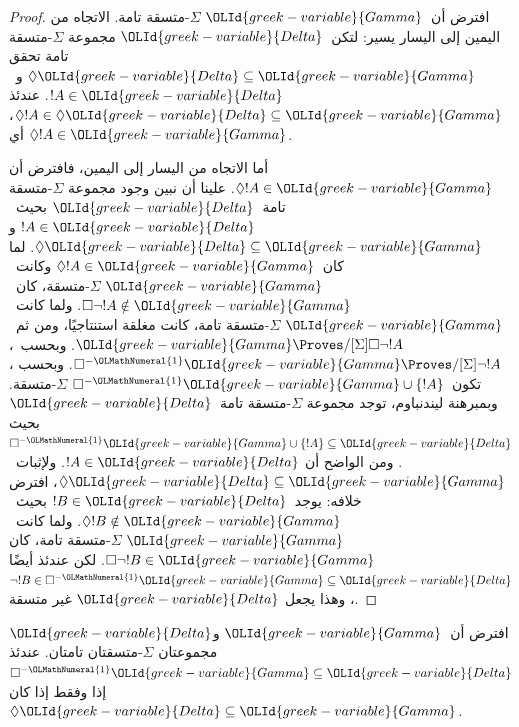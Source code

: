 \documentclass[../../../include/open-logic-section]{subfiles}
\begin{document}
{\begin{proof}
  افترض أن~$\OLId{greek-variable}{Gamma}$ $\Sigma$-متسقة تامة. الاتجاه من اليمين إلى اليسار
  يسير: لتكن~$\OLId{greek-variable}{Delta}$ مجموعة $\Sigma$-متسقة تامة تحقق
  $\Diamond\OLId{greek-variable}{Delta} \subseteq \OLId{greek-variable}{Gamma}$ و~$!A \in \OLId{greek-variable}{Delta}$. عندئذ
  $\Diamond!A \in \Diamond\OLId{greek-variable}{Delta} \subseteq \OLId{greek-variable}{Gamma}$، أي
  $\Diamond!A \in \OLId{greek-variable}{Gamma}$.

  أما الاتجاه من اليسار إلى اليمين، فافترض أن
  $\Diamond !A \in \OLId{greek-variable}{Gamma}$. علينا أن نبين وجود مجموعة $\Sigma$-متسقة
  تامة~$\OLId{greek-variable}{Delta}$ بحيث~$!A \in \OLId{greek-variable}{Delta}$ و
  $\Diamond\OLId{greek-variable}{Delta} \subseteq \OLId{greek-variable}{Gamma}$. لما كان~$\Diamond !A \in \OLId{greek-variable}{Gamma}$
  وكانت~$\OLId{greek-variable}{Gamma}$ $\Sigma$-متسقة، كان~$\Box\lnot !A \notin \OLId{greek-variable}{Gamma}$.
  ولما كانت~$\OLId{greek-variable}{Gamma}$ $\Sigma$-متسقة تامة، كانت مغلقة استنتاجيًا، ومن
  ثم~$\OLId{greek-variable}{Gamma} \Proves/[\Sigma] \Box\lnot !A$. وبحسب~،
  $\Box^{-\OLMathNumeral{1}}\OLId{greek-variable}{Gamma} \Proves/[\Sigma] \lnot !A$. وبحسب
  ،
  تكون~$\Box^{-\OLMathNumeral{1}}\OLId{greek-variable}{Gamma} \cup \{!A\}$ $\Sigma$-متسقة. وبمبرهنة
  ليندنباوم، توجد مجموعة $\Sigma$-متسقة تامة~$\OLId{greek-variable}{Delta}$ بحيث
  $\Box^{-\OLMathNumeral{1}}\OLId{greek-variable}{Gamma} \cup \{!A\} \subseteq \OLId{greek-variable}{Delta}$. ومن الواضح أن
  $!A \in \OLId{greek-variable}{Delta}$. ولإثبات~$\Diamond\OLId{greek-variable}{Delta} \subseteq \OLId{greek-variable}{Gamma}$، افترض
  خلافه: يوجد~$!B \in \OLId{greek-variable}{Delta}$ بحيث~$\Diamond !B \notin \OLId{greek-variable}{Gamma}$.
  ولما كانت~$\OLId{greek-variable}{Gamma}$ $\Sigma$-متسقة تامة، كان
  $\Box\lnot !B \in \OLId{greek-variable}{Gamma}$. لكن عندئذ أيضًا
  $\lnot !B \in \Box^{-\OLMathNumeral{1}}\OLId{greek-variable}{Gamma} \subseteq \OLId{greek-variable}{Delta}$، وهذا يجعل
  $\OLId{greek-variable}{Delta}$ غير متسقة.
\end{proof}
}

\begin{lem}
  افترض أن~$\OLId{greek-variable}{Gamma}$ و$\OLId{greek-variable}{Delta}$ مجموعتان $\Sigma$-متسقتان تامتان. عندئذ
  $\Box^{-\OLMathNumeral{1}}\OLId{greek-variable}{Gamma} \subseteq \OLId{greek-variable}{Delta}$ إذا وفقط إذا كان
  $\Diamond\OLId{greek-variable}{Delta} \subseteq \OLId{greek-variable}{Gamma}$.
\end{lem}
\end{document}
